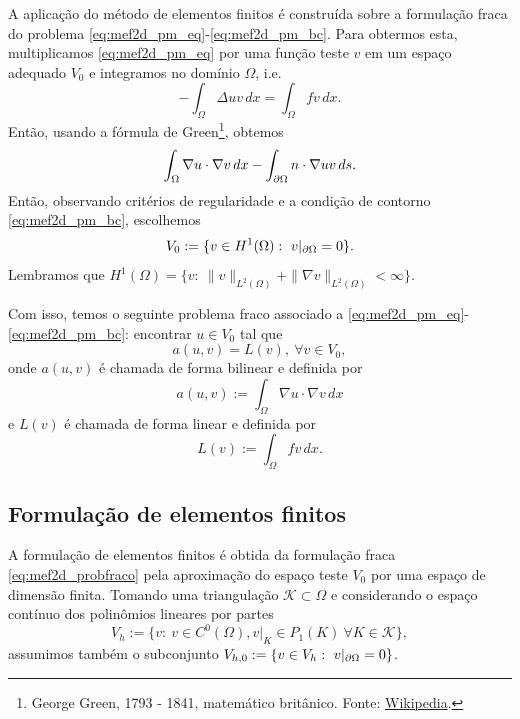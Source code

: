 A aplicação do método de elementos finitos é construída sobre a formulação fraca do problema \eqref{eq:mef2d_pm_eq}-\eqref{eq:mef2d_pm_bc}. Para obtermos esta, multiplicamos \eqref{eq:mef2d_pm_eq} por uma função teste $v$ em um espaço adequado $V_0$ e integramos no domínio $\Omega$, i.e.
\begin{equation}
  - \int_\Omega \Delta uv\,dx = \int_\Omega fv\,dx.
\end{equation}
Então, usando a fórmula de Green\footnote{George Green, 1793 - 1841, matemático britânico. Fonte: \href{https://en.wikipedia.org/wiki/George_Green_(mathematician)}{Wikipedia}.}, obtemos
\begin{equation}
  \int_\Omega \nabla u\cdot\nabla v\,dx - \int_{\partial\Omega} n\cdot\nabla uv\,ds.
\end{equation}
Então, observando critérios de regularidade e a condição de contorno \eqref{eq:mef2d_pm_bc}, escolhemos
\begin{equation}
  V_0 := \{v\in H^1(\Omega):~v|_{\partial\Omega}=0\}.
\end{equation}
Lembramos que $H^1(\Omega) = \{v:~\|v\|_{L^2(\Omega)}+\|\nabla v\|_{L^2(\Omega)}<\infty\}$.

Com isso, temos o seguinte problema fraco associado a \eqref{eq:mef2d_pm_eq}-\eqref{eq:mef2d_pm_bc}: encontrar $u\in V_0$ tal que
\begin{equation}\label{eq:mef2d_probfraco}
  a(u,v) = L(v),~\forall v\in V_0,
\end{equation}
onde $a(u, v)$ é chamada de forma bilinear e definida por
\begin{equation}
  a(u,v) := \int_\Omega \nabla u\cdot\nabla v\,dx
\end{equation}
e $L(v)$ é chamada de forma linear e definida por
\begin{equation}
  L(v) := \int_\Omega fv\,dx.
\end{equation}

\subsection{Formulação de elementos finitos}
\badgeRevisar

A formulação de elementos finitos é obtida da formulação fraca \eqref{eq:mef2d_probfraco} pela aproximação do espaço teste $V_0$ por uma espaço de dimensão finita. Tomando uma triangulação $\mathcal{K}\subset\Omega$ e considerando o espaço contínuo dos polinômios lineares por partes
\begin{equation}
  V_h := \{v:~v\in C^0(\Omega), v|_K\in P_1(K)~\forall K\in\mathcal{K}\},
\end{equation}
assumimos também o subconjunto $V_{h,0}:= \{v\in V_h:~v|_{\partial\Omega}=0\}$.

